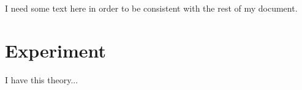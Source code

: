 I need some text here in order to be consistent with the rest of my document.

\section{Experiment}

I have this theory...
